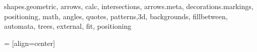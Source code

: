 \usepackage{xcolor}
\usepackage{graphicx}
\usepackage{ifthen}
\usepackage{xifthen}
\usepackage{amssymb,amsmath,amsthm}
\usepackage{pgf,pgfplots,pgfkeys}
\usepackage{tikz}
\usepackage{tkz-euclide}
\usepackage{siunitx} %
\usepackage{caption}

%

\usetikzlibrary
    {
      shapes.geometric,
      arrows,
      calc,
      intersections,
      arrows.meta,
      decorations.markings,
      positioning,
      math,
      angles,
      quotes,
      patterns,3d,
      backgrounds,
      fillbetween,
      automata,
      trees,
      external,
      fit,
      positioning
    }


\makeatletter
\newcommand{\gettikzxy}[3]{%
  \tikz@scan@one@point\pgfutil@firstofone#1\relax
  \edef#2{\the\pgf@x}%
  \edef#3{\the\pgf@y}%
  \tikzmath{#2=#2/28.3465;};
  \tikzmath{#3=#3/28.3465;};
}
 = [align=center]
\makeatother


\pgfplotsset{compat=1.18}



\newcommand\DrawControl[3]{
  node[#2,circle,fill=#2,inner sep=2pt,label={above:$#1$},label={[black]below:{\footnotesize#3}}] at #1 {}
 }

